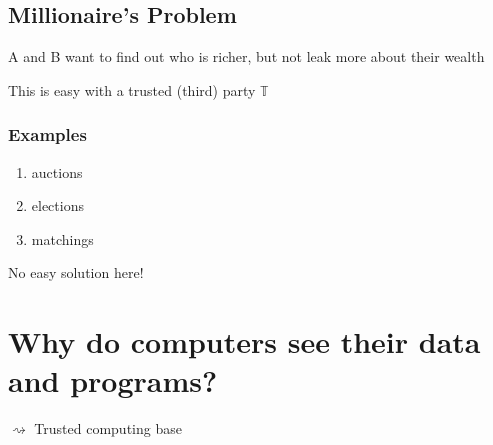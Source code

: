 \documentclass{report}
\begin{document}
\begin{adjustwidth}{2em}{2em}
 	\subsection{Millionaire's Problem}
 	\begin{adjustwidth}{2em}{2em}
 		A and B want to find out who is richer, but not leak more about their wealth
 		\begin{center}\begin{tikzpicture}
 		\end{tikzpicture}\end{center}
 		This is easy with a trusted (third) party $\mathbb{T}$
 		\begin{center}\begin{tikzpicture}
 		\end{tikzpicture}\end{center}
 		\subsubsection{Examples}
 		\begin{adjustwidth}{1em}{}
 			\begin{enumerate}[-]
 				\item auctions
 				\item elections
 				\item matchings
 			\end{enumerate}
 		\end{adjustwidth}
 		No easy solution here!
 	\end{adjustwidth}
 \end{adjustwidth}
 
 \section{Why do computers see their data and programs?}
 \begin{adjustwidth}{2em}{2em}
 	$\rightsquigarrow$ Trusted computing base
 	\begin{center}\begin{tikzpicture}
 	\end{tikzpicture}\end{center}
 \end{adjustwidth}
 
\end{document}

